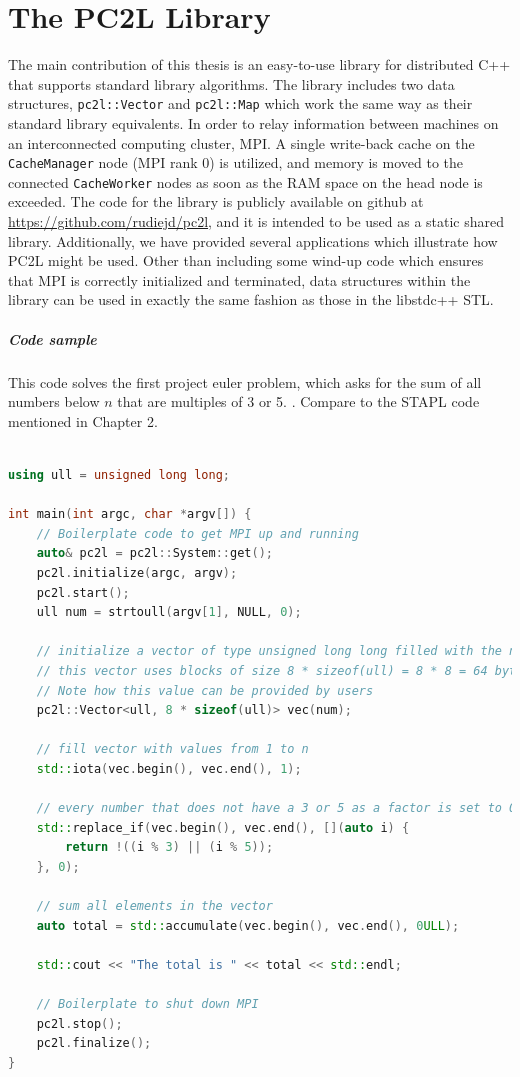 \chapter{The PC2L Library}
The main contribution of this thesis is an easy-to-use library for distributed C++ that supports standard library algorithms. The library includes two data structures, \texttt{pc2l::Vector} and \texttt{pc2l::Map} which work the same way as their standard library equivalents. In order to relay information between machines on an interconnected computing cluster, MPI. A single write-back cache on the \texttt{CacheManager} node (MPI rank 0) is utilized, and memory is moved to the connected \texttt{CacheWorker} nodes as soon as the RAM space on the head node is exceeded. The code for the library is publicly available on github at \url{https://github.com/rudiejd/pc2l}, and it is intended to be used as a static shared library. Additionally, we have provided several applications which illustrate how PC2L might be used. Other than including some wind-up code which ensures that MPI is correctly initialized and terminated, data structures within the library can be used in exactly the same fashion as those in the libstdc++ STL.

\paragraph{Code sample}
This code solves the first project euler problem, which asks for the sum of all numbers below $n$ that are multiples of 3 or 5. \cite{euler_1}. Compare to the STAPL code mentioned in Chapter 2.
\scriptsize
\begin{lstlisting}[language=C++, caption=PC2L code sample for Project Euler number 1. Headers removed for brevity, captionpos=b]

using ull = unsigned long long;

int main(int argc, char *argv[]) {
    // Boilerplate code to get MPI up and running
    auto& pc2l = pc2l::System::get();
    pc2l.initialize(argc, argv);
    pc2l.start();
    ull num = strtoull(argv[1], NULL, 0);

    // initialize a vector of type unsigned long long filled with the number specified by 2nd command line argument
    // this vector uses blocks of size 8 * sizeof(ull) = 8 * 8 = 64 bytes (on most systems)
    // Note how this value can be provided by users
    pc2l::Vector<ull, 8 * sizeof(ull)> vec(num);

    // fill vector with values from 1 to n
    std::iota(vec.begin(), vec.end(), 1);

    // every number that does not have a 3 or 5 as a factor is set to 0
    std::replace_if(vec.begin(), vec.end(), [](auto i) {
        return !((i % 3) || (i % 5));
    }, 0);

    // sum all elements in the vector
    auto total = std::accumulate(vec.begin(), vec.end(), 0ULL);

    std::cout << "The total is " << total << std::endl;

    // Boilerplate to shut down MPI
    pc2l.stop();
    pc2l.finalize();
}
\end{lstlisting}
\normalsize
